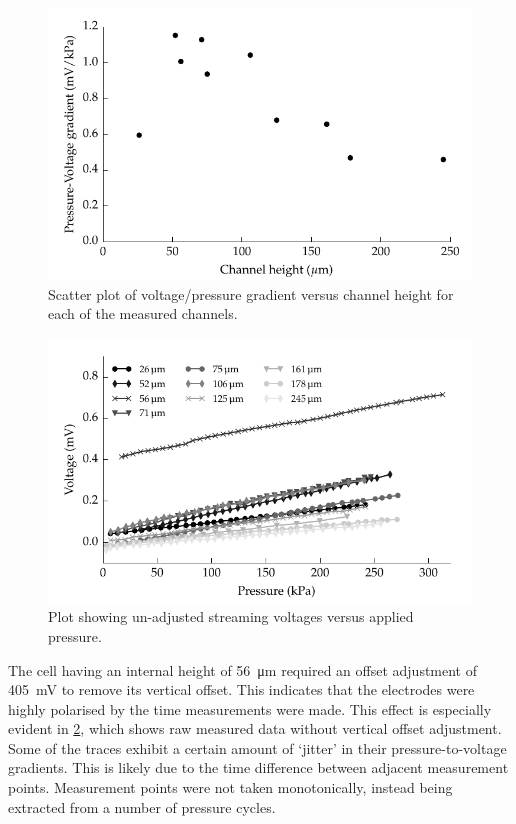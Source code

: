     \begin{figure}
        \centering
        \includegraphics{content/pt1/01-PowerHarvesting/graphics/streamingCell_slopeVsChannelHeight}
        \caption{\label{fig:streamingCell_scatter_voltGradVsHeight}Scatter plot of voltage/pressure gradient versus channel height for each of the measured channels.}
    \end{figure}

    \begin{figure}
        \centering
        \includegraphics{content/pt1/01-PowerHarvesting/graphics/graph_streamingVoltageGradient_vs_height_noCorrection}
        \caption{\label{fig:streamingCell_all_unadjusted}Plot showing un-adjusted streaming voltages versus applied pressure.}
    \end{figure}

    The cell having an internal height of \SI{56}{\micro\meter} required an offset adjustment of \SI{405}{\milli\volt} to remove its vertical offset.
    This indicates that the electrodes were highly polarised by the time measurements were made.
    This effect is especially evident in \cref{fig:streamingCell_all_unadjusted}, which shows raw measured data without vertical offset adjustment.
    Some of the traces exhibit a certain amount of `jitter' in their pressure-to-voltage gradients.
    This is likely due to the time difference between adjacent measurement points.
    Measurement points were not taken monotonically, instead being extracted from a number of pressure cycles.

